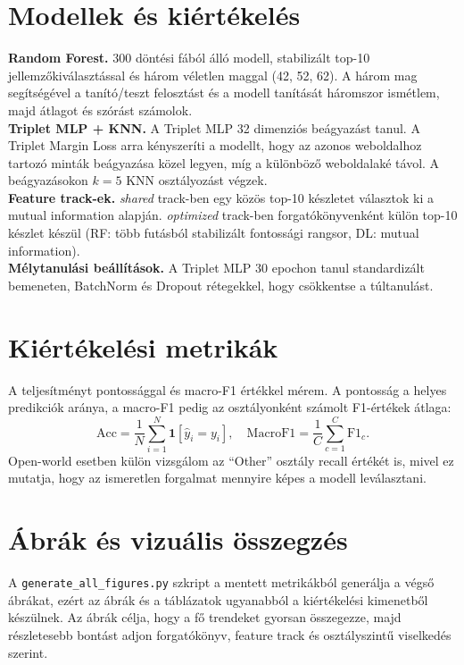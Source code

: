 \documentclass[a4paper,12pt]{article}
\begin{document}
\section{Modellek és kiértékelés}
\textbf{Random Forest.} 300 döntési fából álló modell, stabilizált top-10 jellemzőkiválasztással
és három véletlen maggal (42, 52, 62). A három mag segítségével a tanító/teszt felosztást
és a modell tanítását háromszor ismétlem, majd átlagot és szórást számolok.\\
\textbf{Triplet MLP + KNN.} A Triplet MLP 32 dimenziós beágyazást tanul. A Triplet Margin Loss
arra kényszeríti a modellt, hogy az azonos weboldalhoz tartozó minták beágyazása közel legyen,
míg a különböző weboldalaké távol. A beágyazásokon $k=5$ KNN osztályozást végzek.\\
\textbf{Feature track-ek.} \textit{shared} track-ben egy közös top-10 készletet választok ki a
mutual information alapján. \textit{optimized} track-ben forgatókönyvenként külön top-10
készlet készül (RF: több futásból stabilizált fontossági rangsor, DL: mutual information).\\
\textbf{Mélytanulási beállítások.} A Triplet MLP 30 epochon tanul standardizált bemeneten,
BatchNorm és Dropout rétegekkel, hogy csökkentse a túltanulást.

\section{Kiértékelési metrikák}
A teljesítményt pontossággal és macro-F1 értékkel mérem. A pontosság a helyes predikciók
aránya, a macro-F1 pedig az osztályonként számolt F1-értékek átlaga:
\begin{equation}
    \mathrm{Acc} = \frac{1}{N} \sum_{i=1}^{N} \mathbf{1}[\hat{y}_i = y_i], \quad
    \mathrm{MacroF1} = \frac{1}{C} \sum_{c=1}^{C} \mathrm{F1}_c.
\end{equation}
Open-world esetben külön vizsgálom az ``Other'' osztály recall értékét is, mivel ez mutatja,
hogy az ismeretlen forgalmat mennyire képes a modell leválasztani.

\section{Ábrák és vizuális összegzés}
A \texttt{generate\_all\_figures.py} szkript a mentett metrikákból generálja a végső ábrákat,
ezért az ábrák és a táblázatok ugyanabból a kiértékelési kimenetből készülnek.
Az ábrák célja, hogy a fő trendeket gyorsan összegezze, majd részletesebb bontást adjon
forgatókönyv, feature track és osztályszintű viselkedés szerint.
\end{document}
